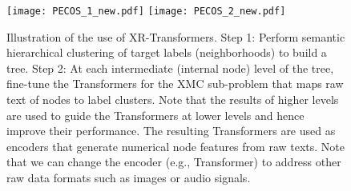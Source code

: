\documentclass{article} %
\begin{document}
\begin{figure}
\centering
  \texttt{[image: PECOS\_1\_new.pdf]}
  \texttt{[image: PECOS\_2\_new.pdf]}
 \vspace{-0.5cm}
\caption{Illustration of the use of XR-Transformers. Step 1: Perform semantic hierarchical clustering of target labels (neighborhoods) to build a tree. Step 2: At each intermediate (internal node) level of the tree, fine-tune the Transformers for the XMC sub-problem that maps raw text of nodes to label clusters. Note that the results of higher levels are used to guide the Transformers at lower levels and hence improve their performance. The resulting Transformers are used as encoders that generate numerical node features from raw texts. Note that we can change the encoder (e.g., Transformer) to address other raw data formats such as images or audio signals.}\label{fig:XRT}
\vspace{-0.1in}
\end{figure}
\end{document}
